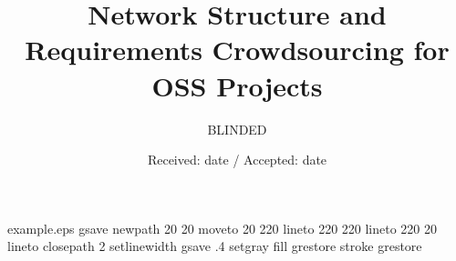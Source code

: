 %
%
%
%
\begin{filecontents*}{example.eps}
gsave
newpath
  20 20 moveto
  20 220 lineto
  220 220 lineto
  220 20 lineto
closepath
2 setlinewidth
gsave
  .4 setgray fill
grestore
stroke
grestore
\end{filecontents*}
%
\RequirePackage{fix-cm}
%
\documentclass{svjour3}                     %
%
\smartqed  %
\usepackage{graphicx}
\usepackage{cite}


\title{Network Structure and Requirements Crowdsourcing for OSS Projects}


\author{BLINDED}


\date{Received: date / Accepted: date}


\maketitle

